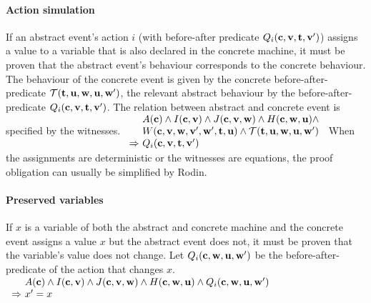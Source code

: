\paragraph{Action simulation}
\label{action_simulation}
If an abstract event's action $i$ (with before-after predicate $Q_i(\mathbf{c},\mathbf{v},\mathbf{t},\mathbf{v}')$)
  assigns a value to a variable that is also declared in the concrete machine,
  it must be proven that the abstract event's behaviour
  corresponds to the concrete behaviour.
The behaviour of the concrete event is given by the concrete before-after-predicate $\mathcal{T}({\mathbf{t},\mathbf{u}},\mathbf{w},\mathbf{u},\mathbf{w}')$,
the relevant abstract behaviour by the before-after-predicate $Q_i(\mathbf{c},\mathbf{v},\mathbf{t},\mathbf{v}')$.
The relation between abstract and concrete event is specified by the witnesses.
%
  {}%
  {$\begin{array}{r@{\ }l}
      & \axioms \land \absinvariants \land \concinvariants 
      \land \concguards \land \\
      & \witnesspred \land \bapred \\
      \limp & Q_i(\allconstants,\absvariables,\absparameters,\absvariables')
    \end{array}$}
When the assignments are deterministic or the witnesses are equations, the proof obligation can usually
be simplified by Rodin.

\paragraph{Preserved variables}
\label{preserved_variables}
If $x$ is a variable of both the abstract and concrete machine and
  the concrete event assigns a value $x$ but the abstract event does not,
  it must be proven that the variable's value does not change.
Let $Q_i(\mathbf{c},\mathbf{w},\mathbf{u},\mathbf{w}')$ be the before-after-predicate
  of the action that changes $x$.
%
  {}%
  {$\begin{array}{r@{\ }l}
      & \axioms \land \absinvariants \land \concinvariants 
      \land \concguards
      \land Q_i(\allconstants,\concvariables,\concparameters,\concvariables') \\
      \limp & x'=x      
    \end{array}$}


